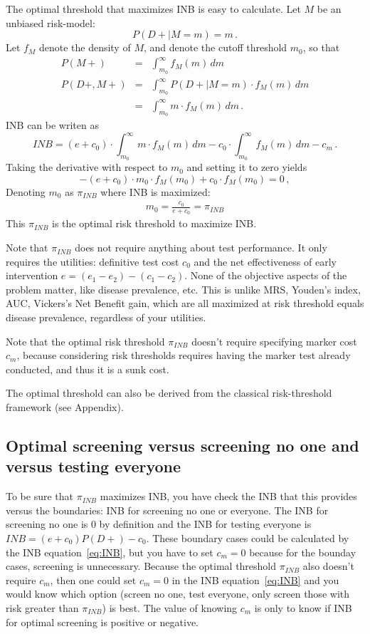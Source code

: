\documentclass[11pt]{article}
\begin{document}
The optimal threshold that maximizes INB is easy to calculate.  Let $M$ be an unbiased risk-model: 
\begin{equation}\label{risk_model}
P(D+|M=m) = m  \,.
\end{equation}
Let $f_M$ denote the density of $M$, and denote the cutoff threshold $m_0$, so that
\begin{eqnarray} \nonumber
P(M+) &=& \int_{m_0}^\infty f_M(m)\,dm\\  \label{expressions}
P(D+,M+) &=& \int_{m_0}^\infty P(D+|M=m)\cdot f_M(m)\,dm\\   \nonumber
         &=& \int_{m_0}^\infty m\cdot f_M(m)\,dm\,.
\end{eqnarray}
INB can be writen as 
\begin{equation}\label{INB2}
INB=(e+c_0)\cdot \int_{m_0}^\infty m\cdot f_M(m)\,dm - c_0\cdot \int_{m_0}^\infty f_M(m)\,dm - c_m\,.
\end{equation}
Taking the derivative with respect to $m_0$ and setting it to zero yields
\[-(e+c_0)\cdot m_0\cdot f_M(m_0) + c_0\cdot f_M(m_0) =0\,, \]
Denoting $m_0$ as $\pi_{INB}$ where INB is maximized:
\begin{eqnarray}
  m_0 = \frac{c_0}{e+c_0} = \pi_{INB} 
\end{eqnarray}
This $\pi_{INB}$ is the optimal risk threshold to maximize INB.  

Note that $\pi_{INB}$ does not require anything about test performance. It only requires the utilities: definitive test cost $c_0$ and the net effectiveness of early intervention $e=(e_1-e_2)-(c_1-c_2)$.  None of the objective aspects of the problem matter, like disease prevalence, etc.  This is unlike MRS, Youden's index, AUC, Vickers's Net Benefit gain, which are all maximized at risk threshold equals disease prevalence, regardless of your utilities.

Note that the optimal risk threshold $\pi_{INB}$ doesn't require specifying marker cost $c_m$, because considering risk thresholds requires having the marker test already conducted, and thus it is a sunk cost.

The optimal threshold can also be derived from the classical risk-threshold framework (see Appendix).

\subsection{Optimal screening versus screening no one and versus testing everyone}
To be sure that $\pi_{INB}$ maximizes INB, you have check the INB that this provides versus the boundaries: INB for screening no one  or everyone.  The INB for screening no one is 0 by definition and the INB for testing everyone is $INB=(e+c_0)P(D+)-c_0$. These boundary cases could be calculated by the INB equation~\ref{eq:INB}, but you have to set $c_m=0$ because for the bounday cases, screening is unnecessary.  Because the optimal threshold $\pi_{INB}$ also doesn't require $c_m$, then one could set $c_m=0$ in the INB equation~\ref{eq:INB} and you would know which option (screen no one, test everyone, only screen those with risk greater than $\pi_{INB}$) is best.  The value of knowing $c_m$ is only to know if INB for optimal screening is positive or negative. 
\end{document}
